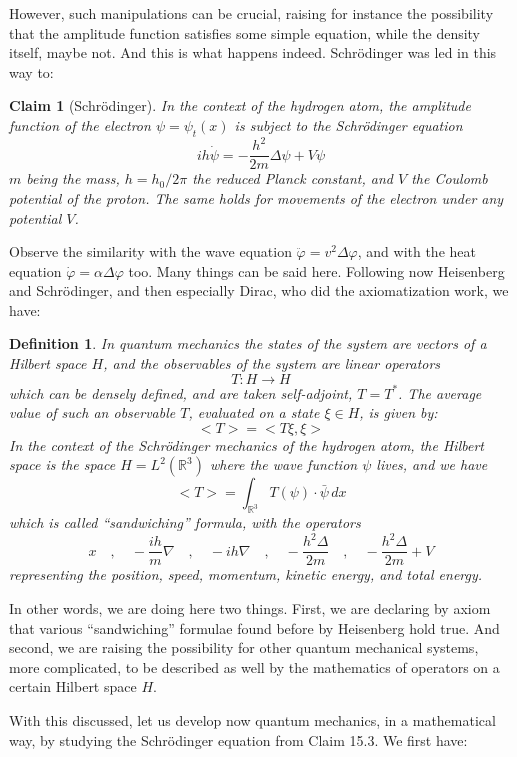 \documentclass[12pt]{amsbook}
\newtheorem{claim}[theorem]{Claim}
\newtheorem{definition}[theorem]{Definition}
\begin{document}
However, such manipulations can be crucial, raising for instance the possibility that the amplitude function satisfies some simple equation, while the density itself, maybe not. And this is what happens indeed. Schr\"odinger was led in this way to:

\begin{claim}[Schr\"odinger]
In the context of the hydrogen atom, the amplitude function of the electron $\psi=\psi_t(x)$  is subject to the Schr\"odinger equation
$$ih\dot{\psi}=-\frac{h^2}{2m}\Delta\psi+V\psi$$
$m$ being the mass, $h=h_0/2\pi$ the reduced Planck constant, and $V$ the Coulomb potential of the proton. The same holds for movements of the electron under any potential $V$.
\end{claim}

Observe the similarity with the wave equation $\ddot{\varphi}=v^2\Delta\varphi$, and with the heat equation $\dot{\varphi}=\alpha\Delta\varphi$ too. Many things can be said here. Following now Heisenberg and Schr\"odinger, and then especially Dirac, who did the axiomatization work, we have:

\begin{definition}
In quantum mechanics the states of the system are vectors of a Hilbert space $H$, and the observables of the system are linear operators 
$$T:H\to H$$
which can be densely defined, and are taken self-adjoint, $T=T^*$. The average value of such an observable $T$, evaluated on a state $\xi\in H$, is given by:
$$<T>=<T\xi,\xi>$$
In the context of the Schr\"odinger mechanics of the hydrogen atom, the Hilbert space is the space $H=L^2(\mathbb R^3)$ where the wave function $\psi$ lives, and we have
$$<T>=\int_{\mathbb R^3}T(\psi)\cdot\bar{\psi}\,dx$$
which is called ``sandwiching'' formula, with the operators 
$$x\quad,\quad-\frac{ih}{m}\nabla\quad,\quad-ih\nabla\quad,\quad -\frac{h^2\Delta}{2m}\quad,\quad -\frac{h^2\Delta}{2m}+V$$
representing the position, speed, momentum, kinetic energy, and total energy.
\end{definition}

In other words, we are doing here two things. First, we are declaring by axiom that various ``sandwiching'' formulae found before by Heisenberg hold true. And second, we are raising the possibility for other quantum mechanical systems, more complicated, to be described as well by the mathematics of operators on a certain Hilbert space $H$.

\bigskip

With this discussed, let us develop now quantum mechanics, in a mathematical way, by studying the Schr\"odinger equation from Claim 15.3. We first have:
\end{document}
